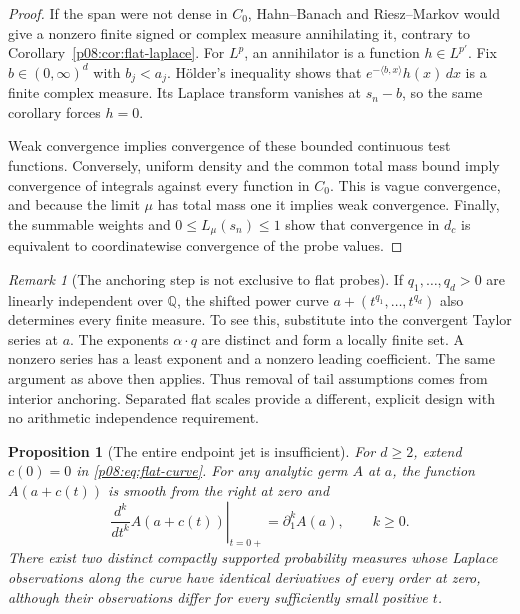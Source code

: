 \documentclass[11pt,letterpaper]{article}
\newtheorem{proposition}[theorem]{Proposition}
\theoremstyle{definition}
\theoremstyle{remark}
\newtheorem{remark}[theorem]{Remark}
\newcommand{\1}{\mathbf 1}
\begin{document}
\begin{proof}
If the span were not dense in $C_0$, Hahn--Banach and
Riesz--Markov would give a nonzero finite signed or complex measure
annihilating it, contrary to Corollary~\ref{p08:cor:flat-laplace}.
For $L^p$, an annihilator is a function $h\in L^{p'}$.
Fix $b\in(0,\infty)^d$ with $b_j<a_j$.
H\"older's inequality shows that
$e^{-\langle b,x\rangle}h(x)\,dx$ is a finite complex measure.
Its Laplace transform vanishes at $s_n-b$, so the same corollary
forces $h=0$.

Weak convergence implies convergence of these bounded continuous
test functions.  Conversely, uniform density and the common total
mass bound imply convergence of integrals against every function
in $C_0$.  This is vague convergence, and because the limit $\mu$
has total mass one it implies weak convergence.  Finally, the
summable weights and $0\le L_\mu(s_n)\le1$ show that convergence
in $d_c$ is equivalent to coordinatewise convergence of the probe
values.
\end{proof}

\begin{remark}[The anchoring step is not exclusive to flat probes]
\label{p08:rem:flat-power-comparison}
If $q_1,\ldots,q_d>0$ are linearly independent over $\mathbb Q$,
the shifted power curve $a+(t^{q_1},\ldots,t^{q_d})$ also determines
every finite measure.  To see this, substitute into the convergent
Taylor series at $a$.  The exponents $\alpha\cdot q$ are distinct
and form a locally finite set.  A nonzero series has a least
exponent and a nonzero leading coefficient.  The same argument as
above then applies.  Thus removal of tail assumptions comes from
interior anchoring.  Separated flat scales provide a different,
explicit design with no arithmetic independence requirement.
\end{remark}

\begin{proposition}[The entire endpoint jet is insufficient]
\label{p08:prop:flat-jet-blind}
For $d\ge2$, extend $c(0)=0$ in \eqref{p08:eq:flat-curve}.
For any analytic germ $A$ at $a$, the function
$A(a+c(t))$ is smooth from the right at zero and
\begin{equation}
 \left.\frac{d^k}{dt^k}A(a+c(t))\right|_{t=0+}
   =\partial_1^k A(a),\qquad k\ge0.
 \label{p08:eq:flat-jet}
\end{equation}
There exist two distinct compactly supported probability measures
whose Laplace observations along the curve have identical derivatives
of every order at zero, although their observations differ for every
sufficiently small positive $t$.
\end{proposition}
\end{document}
